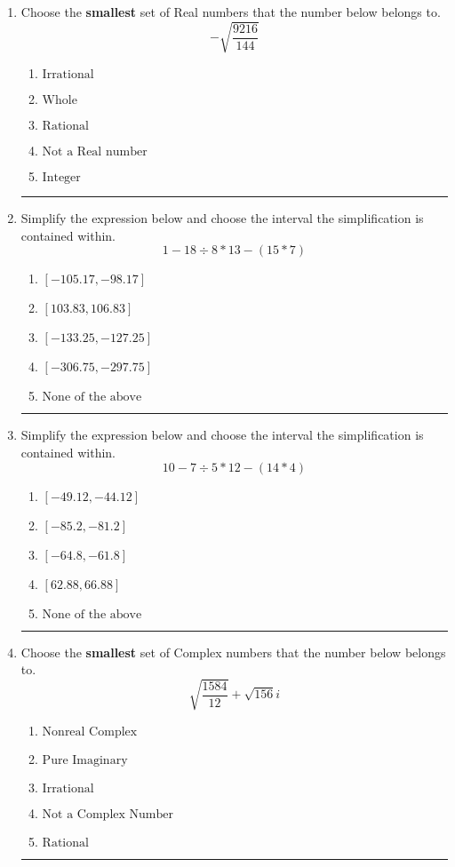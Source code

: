 \documentclass[14pt]{extbook}
\newcommand{\litem}[1]{\item#1\hspace*{-1cm}\rule{\textwidth}{0.4pt}}
\begin{document}
\begin{enumerate}
\litem{
Choose the \textbf{smallest} set of Real numbers that the number below belongs to.\[ -\sqrt{\frac{9216}{144}} \]\begin{enumerate}[label=\Alph*.]
\item \( \text{Irrational} \)
\item \( \text{Whole} \)
\item \( \text{Rational} \)
\item \( \text{Not a Real number} \)
\item \( \text{Integer} \)

\end{enumerate} }
\litem{
Simplify the expression below and choose the interval the simplification is contained within.\[ 1 - 18 \div 8 * 13 - (15 * 7) \]\begin{enumerate}[label=\Alph*.]
\item \( [-105.17, -98.17] \)
\item \( [103.83, 106.83] \)
\item \( [-133.25, -127.25] \)
\item \( [-306.75, -297.75] \)
\item \( \text{None of the above} \)

\end{enumerate} }
\litem{
Simplify the expression below and choose the interval the simplification is contained within.\[ 10 - 7 \div 5 * 12 - (14 * 4) \]\begin{enumerate}[label=\Alph*.]
\item \( [-49.12, -44.12] \)
\item \( [-85.2, -81.2] \)
\item \( [-64.8, -61.8] \)
\item \( [62.88, 66.88] \)
\item \( \text{None of the above} \)

\end{enumerate} }
\litem{
Choose the \textbf{smallest} set of Complex numbers that the number below belongs to.\[ \sqrt{\frac{1584}{12}}+\sqrt{156} i \]\begin{enumerate}[label=\Alph*.]
\item \( \text{Nonreal Complex} \)
\item \( \text{Pure Imaginary} \)
\item \( \text{Irrational} \)
\item \( \text{Not a Complex Number} \)
\item \( \text{Rational} \)


\end{enumerate}}
\end{enumerate}
\end{document}

